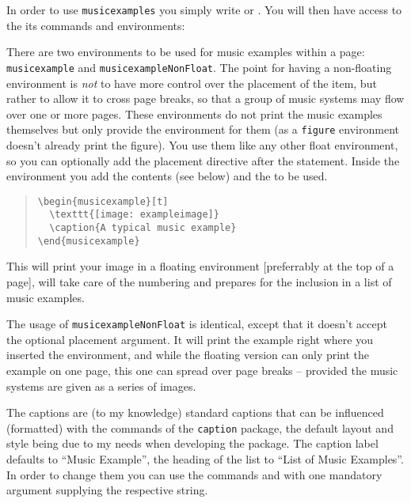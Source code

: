 \documentclass{OLLbook}
\begin{document}
\bigskip
In order to use \texttt{musicexamples} you simply write  or .
You will then have access to the its commands and environments:

There are two environments to be used for music examples within a page: \texttt{musicexample} and \texttt{musicexampleNonFloat}.
The point for having a non-floating environment is \emph{not} to have more control over the placement of the item, but rather to allow it to cross page breaks, so that a group of music systems may flow over one or more pages. 
These environments do not print the music examples themselves but only provide the environment for them (as a \texttt{figure} environment doesn't already print the figure).
You use them like any other float environment, so you can optionally add the placement directive after the  statement.
Inside the environment you add the contents (see below) and the  to be used.
\begin{quote}
\begin{verbatim}
\begin{musicexample}[t]
  \texttt{[image: exampleimage]}
  \caption{A typical music example}
\end{musicexample}
\end{verbatim}
\end{quote}

This will print your image in a floating environment [preferrably at the top of a page], will take care of the numbering and prepares for the inclusion in a list of music examples.

The usage of \texttt{musicexampleNonFloat} is identical, except that it doesn't accept the optional placement argument.
It will print the example right where you inserted the environment, and while the floating version can only print the example on one page, this one can spread over page breaks -- provided the music systems are given as a series of images.

The captions are (to my knowledge) standard captions that can be influenced (formatted) with the commands of the \texttt{caption} package, the default layout and style being due to my needs when developing the package.
The caption label defaults to “Music Example”, the heading of the list to “List of Music Examples”.
In order to change them you can use the commands  and  with one mandatory argument supplying the respective string.
\begin{quote}
\begin{verbatim}

\end{verbatim}
\end{quote}
\end{document}
